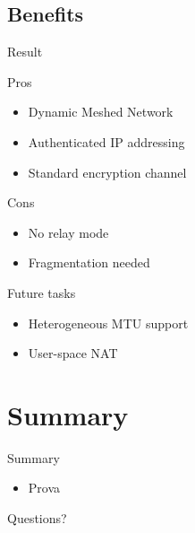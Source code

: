 \documentclass{beamer}
\newcommand*{\comparativeframe}[5]{
\begin{frame}{#1}
	#2
	\begin{exampleblock}{Pros}
		\begin{itemize}
		#3
		\end{itemize}
	\end{exampleblock}
	\begin{alertblock}{Cons}
		\begin{itemize}
		#4
		\end{itemize}
	\end{alertblock}
	#5
\end{frame}
}
\begin{document}
\subsection{Benefits}
\comparativeframe{Result}{}
{%
\item Dynamic Meshed Network
\item Authenticated IP addressing
\item Standard encryption channel
}{%
\item No relay mode
\item Fragmentation needed
}{
\begin{block}{Future tasks}\begin{itemize}
\item Heterogeneous MTU support
\item User-space NAT
\end{itemize}\end{block}
}

\section*{Summary}
\begin{frame}{Summary}
	\begin{itemize}
	\item \alert{Prova}
	\end{itemize}
\end{frame}

\begin{frame}
\begin{center}
Questions?
\end{center}
\end{frame}
\end{document}
